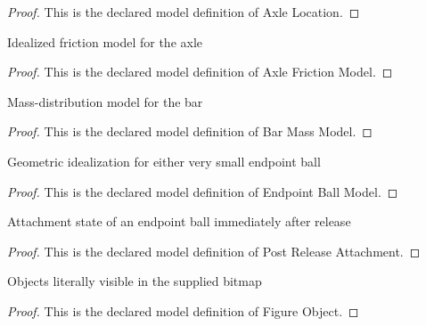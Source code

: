 \begin{proof}
  This is the declared model definition of Axle Location.
\end{proof}
\begin{definition}
  \label{def:physics:phyx-mini-0782:phyxminiproblems-problemphyxmini0782-axlefrictionmodel}
  Idealized friction model for the axle
\end{definition}
\begin{proof}
  This is the declared model definition of Axle Friction Model.
\end{proof}
\begin{definition}
  \label{def:physics:phyx-mini-0782:phyxminiproblems-problemphyxmini0782-barmassmodel}
  Mass-distribution model for the bar
\end{definition}
\begin{proof}
  This is the declared model definition of Bar Mass Model.
\end{proof}
\begin{definition}
  \label{def:physics:phyx-mini-0782:phyxminiproblems-problemphyxmini0782-endpointballmodel}
  Geometric idealization for either very small endpoint ball
\end{definition}
\begin{proof}
  This is the declared model definition of Endpoint Ball Model.
\end{proof}
\begin{definition}
  \label{def:physics:phyx-mini-0782:phyxminiproblems-problemphyxmini0782-postreleaseattachment}
  Attachment state of an endpoint ball immediately after release
\end{definition}
\begin{proof}
  This is the declared model definition of Post Release Attachment.
\end{proof}
\begin{definition}
  \label{def:physics:phyx-mini-0782:phyxminiproblems-problemphyxmini0782-figureobject}
  Objects literally visible in the supplied bitmap
\end{definition}
\begin{proof}
  This is the declared model definition of Figure Object.
\end{proof}
